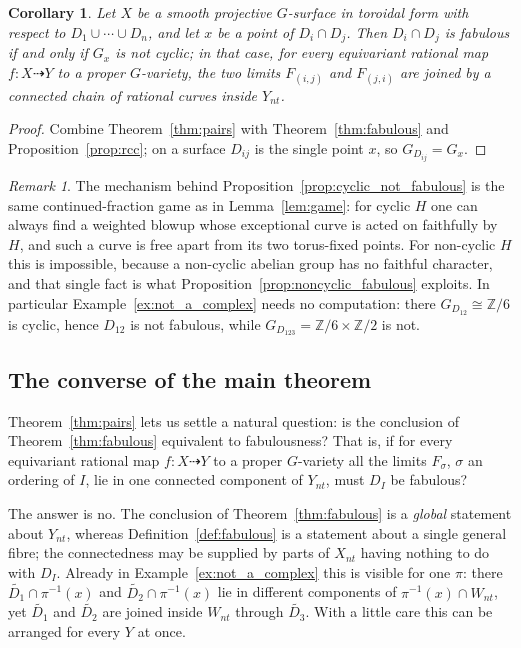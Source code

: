 \documentclass[11pt]{amsart}
\theoremstyle{plain}
\newtheorem{corollary}[theorem]{Corollary}
\theoremstyle{definition}
\theoremstyle{remark}
\newtheorem{remark}[theorem]{Remark}
\numberwithin{equation}{section}
\begin{document}
\begin{corollary}
Let $X$ be a smooth projective $G$-surface in toroidal form with respect to
$D_1 \cup \cdots \cup D_n$, and let $x$ be a point of $D_i \cap D_j$.  Then
$D_i \cap D_j$ is fabulous if and only if $G_x$ is not cyclic; in that case,
for every equivariant rational map $f : X \dasharrow Y$ to a proper
$G$-variety, the two limits $F_{(i,j)}$ and $F_{(j,i)}$ are joined by a
connected chain of rational curves inside $Y_{nt}$.
\end{corollary}

\begin{proof}
Combine Theorem~\ref{thm:pairs} with Theorem~\ref{thm:fabulous} and
Proposition~\ref{prop:rcc}; on a surface $D_{ij}$ is the single point $x$,
so $G_{D_{ij}} = G_x$.
\end{proof}

\begin{remark}
The mechanism behind Proposition~\ref{prop:cyclic_not_fabulous} is the same
continued-fraction game as in Lemma~\ref{lem:game}: for cyclic $H$ one can
always find a weighted blowup whose exceptional curve is acted on faithfully
by $H$, and such a curve is free apart from its two torus-fixed points.  For
non-cyclic $H$ this is impossible, because a non-cyclic abelian group has no
faithful character, and that single fact is what
Proposition~\ref{prop:noncyclic_fabulous} exploits.  In particular
Example~\ref{ex:not_a_complex} needs no computation: there
$G_{D_{12}} \cong \mathbb{Z}/6$ is cyclic, hence $D_{12}$ is not fabulous,
while $G_{D_{123}} = \mathbb{Z}/6 \times \mathbb{Z}/2$ is not.
\end{remark}

\subsection*{The converse of the main theorem}

Theorem~\ref{thm:pairs} lets us settle a natural question: is the
conclusion of Theorem~\ref{thm:fabulous} equivalent to fabulousness?  That
is, if for every equivariant rational map $f : X \dasharrow Y$ to a proper
$G$-variety all the limits $F_\sigma$, $\sigma$ an ordering of $I$, lie in
one connected component of $Y_{nt}$, must $D_I$ be fabulous?

The answer is no.  The conclusion of Theorem~\ref{thm:fabulous} is a
\emph{global} statement about $Y_{nt}$, whereas
Definition~\ref{def:fabulous} is a statement about a single general fibre;
the connectedness may be supplied by parts of $X_{nt}$ having nothing to do
with $D_I$.  Already in Example~\ref{ex:not_a_complex} this is visible for
one $\pi$: there $\widetilde{D_1} \cap \pi^{-1}(x)$ and $\widetilde{D_2}
\cap \pi^{-1}(x)$ lie in different components of $\pi^{-1}(x) \cap W_{nt}$,
yet $\widetilde{D_1}$ and $\widetilde{D_2}$ are joined inside $W_{nt}$
through $\widetilde{D_3}$.  With a little care this can be arranged for
every $Y$ at once.
\end{document}
